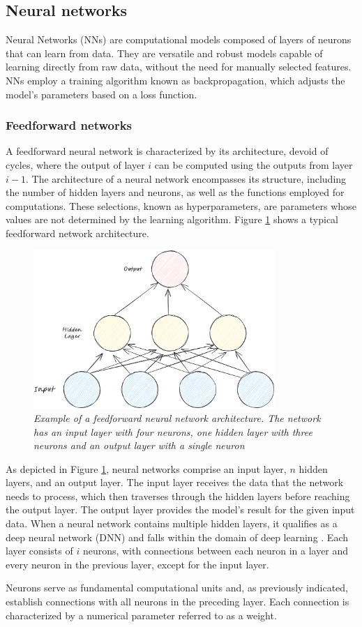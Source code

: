 \subsection{Neural networks}

Neural Networks (NNs) are computational models composed of layers of neurons that can learn from data. They are versatile and robust models capable of learning directly from raw data, without the need for manually selected features. NNs employ a training algorithm known as backpropagation, which adjusts the model's parameters based on a loss function.

\subsubsection*{Feedforward networks}

A feedforward neural network is characterized by its architecture, devoid of cycles, where the output of layer \(i\) can be computed using the outputs from layer \(i - 1\). The architecture of a neural network encompasses its structure, including the number of hidden layers and neurons, as well as the functions employed for computations. These selections, known as hyperparameters, are parameters whose values are not determined by the learning algorithm. Figure \ref{fig:ffn} shows a typical feedforward network architecture.


\begin{figure}[H]
    \centering
    \includegraphics[width=\textwidth,height=6cm,keepaspectratio=true]{ffn.png}
    \caption{
        \it{Example of a feedforward neural network architecture. The network has an
            input layer with four neurons, one hidden layer with three neurons and an output layer
            with a single neuron}
    }
    \label{fig:ffn}
\end{figure}

As depicted in Figure \ref{fig:ffn}, neural networks comprise an input layer, \(n\) hidden layers, and an output layer. The input layer receives the data that the network needs to process, which then traverses through the hidden layers before reaching the output layer. The output layer provides the model's result for the given input data. When a neural network contains multiple hidden layers, it qualifies as a deep neural network (DNN) and falls within the domain of deep learning \cite{oshea2015introduction}. Each layer consists of \(i\) neurons, with connections between each neuron in a layer and every neuron in the previous layer, except for the input layer.

Neurons serve as fundamental computational units and, as previously indicated, establish connections with all neurons in the preceding layer. Each connection is characterized by a numerical parameter referred to as a weight.